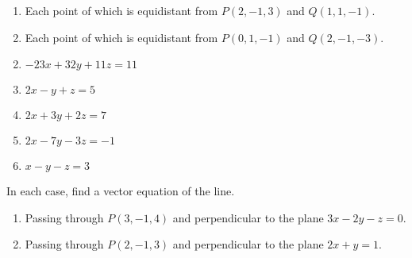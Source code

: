 \begin{multicols}{2}
\begin{ex}
\begin{enumerate}[label={\alph*.}]
\item Each point of which is equidistant from $P(2, -1, 3)$ and $Q(1, 1, -1)$.

\item Each point of which is equidistant from $P(0, 1, -1)$ and $Q(2, -1, -3)$.

\end{enumerate}
\begin{sol}
\begin{enumerate}[label={\alph*.}]
\setcounter{enumi}{1}
\item  $-23x + 32y + 11z = 11$

\setcounter{enumi}{3}
\item  $2x - y + z = 5$

\setcounter{enumi}{5}
\item  $2x + 3y + 2z = 7$

\setcounter{enumi}{7}
\item  $2x - 7y - 3z = -1$

\setcounter{enumi}{9}
\item  $x - y - z = 3$

\end{enumerate}
\end{sol}
\end{ex}

\begin{ex}
In each case, find a vector equation of the line.


\begin{enumerate}[label={\alph*.}]
\item Passing through $P(3, -1, 4)$ and perpendicular to the plane $3x - 2y - z = 0$.

\item Passing through $P(2, -1, 3)$ and perpendicular to the plane $2x + y = 1$.


\end{enumerate}
\end{ex}
\end{multicols}
